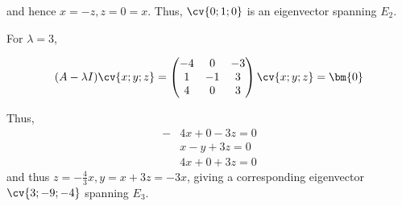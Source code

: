 \documentclass[11pt]{scrartcl}
\begin{document}
\begin{linenumbers}
\begin{soln}
          and hence $x = -z, z = 0 = x$. Thus, $\cv{0; 1; 0} $ is an eigenvector spanning
          $E_{2}$.

          For $\lambda = 3$,

          \begin{equation*}
            (A-\lambda I) \cv{x; y; z}=
            \begin{pmatrix}
              -4 & 0  & -3 \\
              1  & -1 & 3  \\
              4  & 0  & 3
            \end{pmatrix} \cv{x; y; z} = \bm{0}
          \end{equation*}

          Thus, \begin{align}
                  - & 4x  + 0  - 3z  = 0 \\
                    & x  -  y + 3z = 0   \\
                    & 4x + 0 + 3z = 0
                \end{align}
                and thus $z = -\frac{4}{3}x, y = x + 3z =-3x $, giving a
                corresponding eigenvector $\cv{3; -9; -4}$ spanning
                $E_{3}$.
        \end{soln}
\end{linenumbers}
\end{document}
